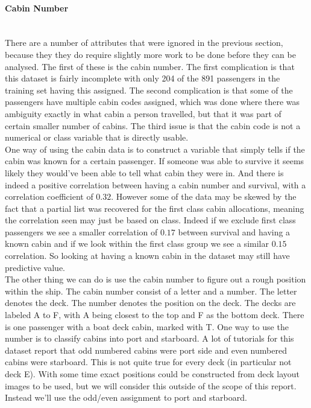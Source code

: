 \documentclass[english, a4paper]{article}
\begin{document}
\paragraph{Cabin Number}~\\
There are a number of attributes that were ignored in the previous section, because they they do require slightly more work to be done before they can be analysed. The first of these is the cabin number. The first complication is that this dataset is fairly incomplete with only 204 of the 891 passengers in the training set having this assigned. The second complication is that some of the passengers have multiple cabin codes assigned, which was done where there was ambiguity exactly in what cabin a person travelled, but that it was part of certain smaller number of cabins. The third issue is that the cabin code is not a numerical or class variable that is directly usable. \\
One way of using the cabin data is to construct a variable that simply tells if the cabin was known for a certain passenger. If someone was able to survive it seems likely they would've been able to tell what cabin they were in. And there is indeed a positive correlation between having a cabin number and survival, with a correlation coefficient of $0.32$. However some of the data may be skewed by the fact that a partial list was recovered for the first class cabin allocations\cite{cavelist}, meaning the correlation seen may just be based on class. Indeed if we exclude first class passengers we see a smaller correlation of $0.17$ between survival and having a known cabin and if we look within the first class group we see a similar $0.15$ correlation. So looking at having a known cabin in the dataset may still have predictive value.\\
The other thing we can do is use the cabin number to figure out a rough position within the ship. The cabin number consist of a letter and a number. The letter denotes the deck. The number denotes the position on the deck. The decks are labeled A to F, with A being closest to the top and F as the bottom deck. There is one passenger with a boat deck cabin, marked with T. One way to use the number is to classify cabins into port and starboard. A lot of tutorials for this dataset report that odd numbered cabins were port side and even numbered cabins were starboard. This is not quite true for every deck (in particular not deck E). With some time exact positions could be constructed from deck layout images to be used, but we will consider this outside of the scope of this report. Instead we'll use the odd/even assignment to port and starboard.\\
\end{document}
